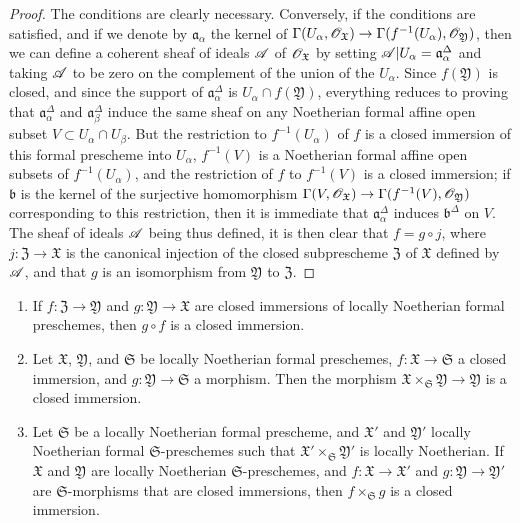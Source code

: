 \begin{proof}
\label{proof-1.10.14.4}
The conditions are clearly necessary.
Conversely, if the conditions are satisfied, and if we denote by $\mathfrak{a}_\alpha$ the kernel of $\Gamma(U_\alpha,\sh{O}_\mathfrak{X})\to\Gamma(f^{-1}(U_\alpha),\sh{O}_\mathfrak{Y})$, then we can define a coherent sheaf of ideals $\mathscr{A}$ of $\mathscr{O}_\mathfrak{X}$ by setting $\mathscr{A}|U_\alpha=\mathfrak{a}_\alpha^\Delta$ and taking $\mathscr{A}$ to be zero on the complement of the union of the $U_\alpha$.
Since $f(\mathfrak{Y})$ is closed, and since the support of $\mathfrak{a}_\alpha^\Delta$ is $U_\alpha\cap f(\mathfrak{Y})$, everything reduces to proving that $\mathfrak{a}_\alpha^\Delta$ and $\mathfrak{a}_\beta^\Delta$ induce the same sheaf on any Noetherian formal affine open subset $V\subset U_\alpha\cap U_\beta$.
But the restriction to $f^{-1}(U_\alpha)$ of $f$ is a closed immersion of this formal prescheme into $U_\alpha$, $f^{-1}(V)$ is a Noetherian formal affine open subsets of $f^{-1}(U_\alpha)$, and the restriction of $f$ to $f^{-1}(V)$ is a closed immersion;
if $\mathfrak{b}$ is the kernel of the surjective homomorphism $\Gamma(V,\sh{O}_\mathfrak{X})\to\Gamma(f^{-1}(V),\sh{O}_\mathfrak{Y})$ corresponding to this restriction, then it is immediate  that $\mathfrak{a}_\alpha^\Delta$ induces $\mathfrak{b}^\Delta$ on $V$.
The sheaf of ideals $\mathscr{A}$ being thus defined, it is then clear that $f=g\circ j$, where $j:\mathfrak{Z}\to\mathfrak{X}$ is the canonical injection of the closed subprescheme $\mathfrak{Z}$ of $\mathfrak{X}$ defined by $\mathscr{A}$, and that $g$ is an isomorphism from $\mathfrak{Y}$ to $\mathfrak{Z}$.
\end{proof}

\begin{proposition}[10.14.5]
\label{1.10.14.5}
\medskip\noindent
\begin{enumerate}[label=\emph{(\roman*)}]
  \item If $f:\mathfrak{Z}\to\mathfrak{Y}$ and $g:\mathfrak{Y}\to\mathfrak{X}$ are closed immersions of locally Noetherian formal preschemes, then $g\circ f$ is a closed immersion.
  \item Let $\mathfrak{X}$, $\mathfrak{Y}$, and $\mathfrak{S}$ be locally Noetherian formal preschemes, $f:\mathfrak{X}\to\mathfrak{S}$ a closed immersion, and $g:\mathfrak{Y}\to\mathfrak{S}$ a morphism.
    Then the morphism $\mathfrak{X}\times_\mathfrak{S}\mathfrak{Y}\to\mathfrak{Y}$ is a closed immersion.
  \item Let $\mathfrak{S}$ be a locally Noetherian formal prescheme, and $\mathfrak{X}'$ and $\mathfrak{Y}'$ locally Noetherian formal $\mathfrak{S}$-preschemes such that $\mathfrak{X}'\times_\mathfrak{S}\mathfrak{Y}'$ is locally Noetherian.
    If $\mathfrak{X}$ and $\mathfrak{Y}$ are locally Noetherian $\mathfrak{S}$-preschemes, and $f:\mathfrak{X}\to\mathfrak{X}'$ and $g:\mathfrak{Y}\to\mathfrak{Y}'$ are $\mathfrak{S}$-morphisms that are closed immersions, then $f\times_\mathfrak{S}g$ is a closed immersion.
\end{enumerate}
\end{proposition}

